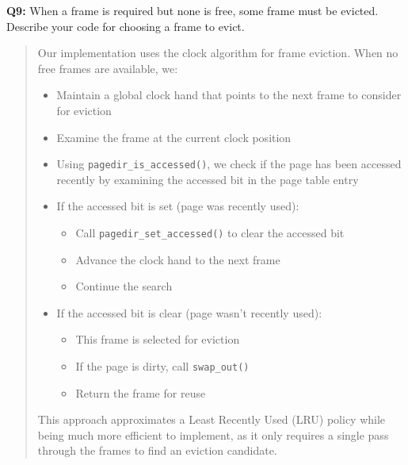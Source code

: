 \documentclass[a4paper,11pt]{paper}
\begin{document}
\textbf{Q9:} When a frame is required but none is free, some frame must be evicted.  Describe your code for choosing a frame to evict.
\begin{quote}
Our implementation uses the clock algorithm for frame eviction. When no free frames are available, we:

\begin{itemize}
  \item Maintain a global clock hand that points to the next frame to consider for eviction
  \item Examine the frame at the current clock position
  \item Using \texttt{pagedir\_is\_accessed()}, we check if the page has been accessed recently by examining the accessed bit in the page table entry
  \item If the accessed bit is set (page was recently used):
  \begin{itemize}
    \item Call \texttt{pagedir\_set\_accessed()} to clear the accessed bit
    \item Advance the clock hand to the next frame
    \item Continue the search
  \end{itemize}
  \item If the accessed bit is clear (page wasn't recently used):
  \begin{itemize}
    \item This frame is selected for eviction
    \item If the page is dirty, call \texttt{swap\_out()}
    \item Return the frame for reuse
  \end{itemize}
\end{itemize}

This approach approximates a Least Recently Used (LRU) policy while being much more efficient to implement, as it only requires a single pass through the frames to find an eviction candidate.
\end{quote}
\end{document}
